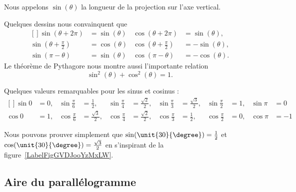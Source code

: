 Nous appelons \( \sin(\theta)\) la longueur de la projection sur l'axe vertical.

Quelques dessins nous convainquent que
\begin{equation}
	\begin{aligned}[]
		\sin(\theta+2\pi)            & =\sin(\theta) & \cos(\theta+2\pi)            & =\sin(\theta),  \\
		\sin(\theta+\frac{ \pi }{2}) & =\cos(\theta) & \cos(\theta+\frac{ \pi }{2}) & =-\sin(\theta), \\
		\sin(\pi-\theta)             & =\sin(\theta) & \cos(\pi-\theta)             & =-\cos(\theta).
	\end{aligned}
\end{equation}
Le théorème de Pythagore nous montre aussi l'importante relation
\begin{equation}
	\sin^2(\theta)+\cos^2(\theta)=1.
\end{equation}

Quelques valeurs remarquables pour les sinus et cosinus :
\begin{equation}
	\begin{aligned}[]
		\sin 0 & =0, & \sin\frac{ \pi }{ 6 } & =\frac{ 1 }{2},        & \sin\frac{ \pi }{ 4 } & =\frac{ \sqrt{2} }{2}, & \sin\frac{ \pi }{ 3 } & =\frac{ \sqrt{3} }{2}, & \sin\frac{ \pi }{2} & =1, & \sin\pi & =0  \\
		\cos 0 & =1, & \cos\frac{ \pi }{ 6 } & =\frac{ \sqrt{3} }{2}, & \cos\frac{ \pi }{ 4 } & =\frac{ \sqrt{2} }{2}, & \cos\frac{ \pi }{ 3 } & =\frac{ 1 }{2},        & \cos\frac{ \pi }{2} & =0, & \cos\pi & =-1
	\end{aligned}
\end{equation}

Nous pouvons prouver simplement que \( \sin(\unit{30}{\degree})=\frac{ 1 }{2}\) et \( \cos(\unit{30}{\degree})=\frac{ \sqrt{3} }{2}\) en s'inspirant de la figure~\ref{LabelFigGVDJooYzMxLW}. %
\newcommand{\CaptionFigGVDJooYzMxLW}{Un triangle équilatéral de côté \( 1\).}


\subsection{Aire du parallélogramme}

